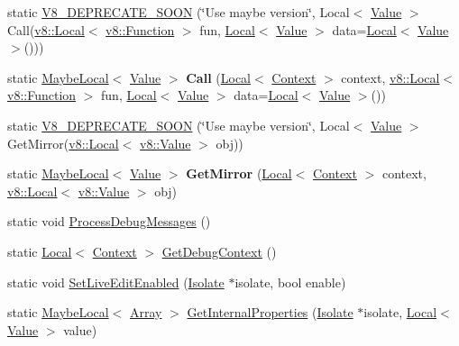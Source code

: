 \begin{DoxyCompactItemize}
\item 
static \hyperlink{classv8_1_1Debug_a82a4a039d33769fae6d94fd2d14e5550}{V8\+\_\+\+D\+E\+P\+R\+E\+C\+A\+T\+E\+\_\+\+S\+O\+O\+N} (\char`\"{}Use maybe version\char`\"{}, Local$<$ \hyperlink{classv8_1_1Value}{Value} $>$ Call(\hyperlink{classv8_1_1Local}{v8\+::\+Local}$<$ \hyperlink{classv8_1_1Function}{v8\+::\+Function} $>$ fun, \hyperlink{classv8_1_1Local}{Local}$<$ \hyperlink{classv8_1_1Value}{Value} $>$ data=\hyperlink{classv8_1_1Local}{Local}$<$ \hyperlink{classv8_1_1Value}{Value} $>$()))
\item 
\hypertarget{classv8_1_1Debug_a32e28ec40dc429e7fa1dfbe1e514ba3d}{}static \hyperlink{classv8_1_1MaybeLocal}{Maybe\+Local}$<$ \hyperlink{classv8_1_1Value}{Value} $>$ {\bfseries Call} (\hyperlink{classv8_1_1Local}{Local}$<$ \hyperlink{classv8_1_1Context}{Context} $>$ context, \hyperlink{classv8_1_1Local}{v8\+::\+Local}$<$ \hyperlink{classv8_1_1Function}{v8\+::\+Function} $>$ fun, \hyperlink{classv8_1_1Local}{Local}$<$ \hyperlink{classv8_1_1Value}{Value} $>$ data=\hyperlink{classv8_1_1Local}{Local}$<$ \hyperlink{classv8_1_1Value}{Value} $>$())\label{classv8_1_1Debug_a32e28ec40dc429e7fa1dfbe1e514ba3d}

\item 
static \hyperlink{classv8_1_1Debug_afc285363a72ad36a56f50428a94c6ce4}{V8\+\_\+\+D\+E\+P\+R\+E\+C\+A\+T\+E\+\_\+\+S\+O\+O\+N} (\char`\"{}Use maybe version\char`\"{}, Local$<$ \hyperlink{classv8_1_1Value}{Value} $>$ Get\+Mirror(\hyperlink{classv8_1_1Local}{v8\+::\+Local}$<$ \hyperlink{classv8_1_1Value}{v8\+::\+Value} $>$ obj))
\item 
\hypertarget{classv8_1_1Debug_ab5f5ae3f4418c576da4633c6fb27b23d}{}static \hyperlink{classv8_1_1MaybeLocal}{Maybe\+Local}$<$ \hyperlink{classv8_1_1Value}{Value} $>$ {\bfseries Get\+Mirror} (\hyperlink{classv8_1_1Local}{Local}$<$ \hyperlink{classv8_1_1Context}{Context} $>$ context, \hyperlink{classv8_1_1Local}{v8\+::\+Local}$<$ \hyperlink{classv8_1_1Value}{v8\+::\+Value} $>$ obj)\label{classv8_1_1Debug_ab5f5ae3f4418c576da4633c6fb27b23d}

\item 
static void \hyperlink{classv8_1_1Debug_a888e06766caee0380c6aa010b00e1a54}{Process\+Debug\+Messages} ()
\item 
static \hyperlink{classv8_1_1Local}{Local}$<$ \hyperlink{classv8_1_1Context}{Context} $>$ \hyperlink{classv8_1_1Debug_a2343a321b0db41324b7e8a7402f57cf0}{Get\+Debug\+Context} ()
\item 
static void \hyperlink{classv8_1_1Debug_ab635f979d369bed13187e2594d825517}{Set\+Live\+Edit\+Enabled} (\hyperlink{classv8_1_1Isolate}{Isolate} $\ast$isolate, bool enable)
\item 
static \hyperlink{classv8_1_1MaybeLocal}{Maybe\+Local}$<$ \hyperlink{classv8_1_1Array}{Array} $>$ \hyperlink{classv8_1_1Debug_a10ef14b11ffdd57287f25b39dc728e07}{Get\+Internal\+Properties} (\hyperlink{classv8_1_1Isolate}{Isolate} $\ast$isolate, \hyperlink{classv8_1_1Local}{Local}$<$ \hyperlink{classv8_1_1Value}{Value} $>$ value)
\end{DoxyCompactItemize}


